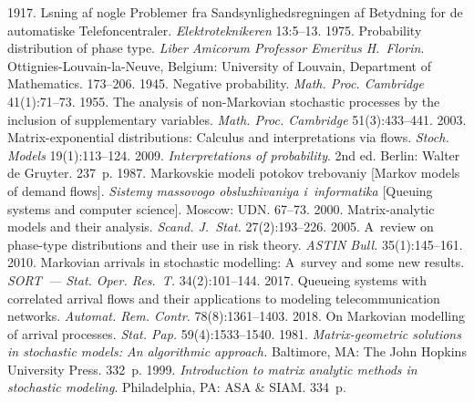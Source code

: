 \begin{multicols}{2}
{{\begin{thebibliography}{99}
   1917. \mbox{L{\!\ptb{\o}}sning} af nogle Problemer fra 
Sandsynlighedsregningen af Betydning for de automatiske Telefoncentraler. \textit{Elektroteknikeren} 
13:5--13.
   1975. Probability distribution of phase type. \textit{Liber Amicorum Professor 
Emeritus H.~Florin}. Ottignies-Louvain-la-Neuve, Belgium: University of Louvain, Department of 
Mathematics.  
173--206.
   1945. Negative probability. \textit{Math. Proc. 
Cambridge} 41(1):71--73.
   1955. The analysis of non-Markovian stochastic processes by the inclusion of 
supplementary variables. \textit{Math. Proc. Cambridge} 
51(3):433--441.
   2003. Matrix-exponential distributions: Calculus and 
interpretations via flows. \textit{Stoch. Models} 19(1):113--124.
   2009. \textit{Interpretations of probability}. 2nd ed. Berlin: Walter de 
Gruyter. 237~p.
   1987. Markovskie modeli potokov trebovaniy [Markov models of demand 
flows]. \textit{Sistemy massovogo obsluzhivaniya i~informatika} [Queuing systems and computer 
science]. Moscow: UDN. 67--73.
   2000. Matrix-analytic models and their analysis. \textit{Scand. 
J.~Stat.} 27(2):193--226.
   2005. A~review on phase-type distributions and their use in risk theory. \textit{ASTIN 
Bull.} 35(1):145--161.
   2010. Markovian arrivals in 
stochastic modelling: A~survey and some new results. \textit{SORT~--- Stat. Oper. Res.~T.}  
34(2):101--144.
   2017. Queueing systems with correlated arrival flows 
and their applications to modeling telecommunication networks. \textit{Automat. Rem. Contr.} 
78(8):1361--1403.
   2018. On Markovian modelling of arrival 
processes. \textit{Stat. Pap.} 59(4):1533--1540.
   1981. \textit{Matrix-geometric solutions in stochastic models: An algorithmic 
approach.} Baltimore, MA: The John Hopkins University Press. 332~p.
   1999. \textit{Introduction to matrix analytic methods in 
stochastic modeling}. Philadelphia, PA: ASA \& SIAM. 334~p.

\end{thebibliography}}}
\end{multicols}
